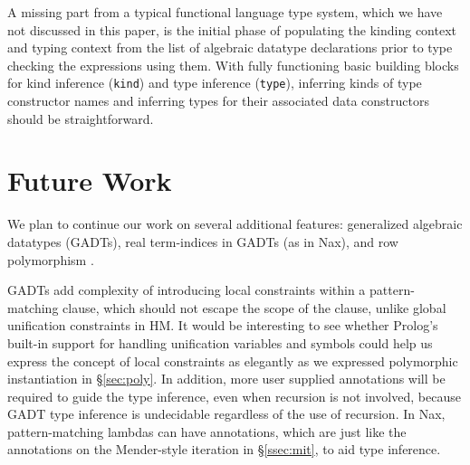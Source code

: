 \documentclass[runningheads,a4paper]{llncs}
\begin{document}
A missing part from a typical functional language type system, which
we have not discussed in this paper, is the initial phase of populating
the kinding context and typing context from the list of algebraic datatype
declarations prior to type checking the expressions using them.
With fully functioning basic building blocks for kind inference
(\verb|kind|) and type inference (\verb|type|), inferring kinds of
type constructor names and inferring types for their associated
data constructors should be straightforward.


\section{Future Work}\label{sec:futwork}
We plan to continue our work on several additional features:
generalized algebraic datatypes (GADTs), real term-indices
in GADTs (as in Nax), and row polymorphism \cite{Gaster96apolymorphic}.

GADTs add complexity of introducing local constraints
within a pattern-matching clause, which should not escape
the scope of the clause, unlike global unification constraints in HM.
It would be interesting to see whether Prolog's built-in support for
handling unification variables and symbols could help us express
the concept of local constraints as elegantly as we expressed
polymorphic instantiation in \S\ref{sec:poly}. In addition,
more user supplied annotations will be required to guide the type inference,
even when recursion is not involved, because GADT type inference is
undecidable \cite{DegtyarevV95} regardless of the use of recursion.
In Nax, pattern-matching lambdas can have annotations, which are
just like the annotations on the Mender-style iteration in \S\ref{ssec:mit},
to aid type inference.
\end{document}
